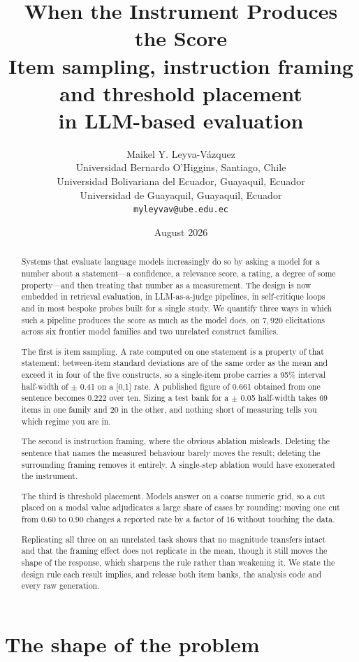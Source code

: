 \documentclass[11pt,letterpaper]{article}
\title{When the Instrument Produces the Score\\
\large Item sampling, instruction framing and threshold placement\\
in {LLM}-based evaluation}
\author{
  Maikel Y. Leyva-V\'azquez\\
  {\small Universidad Bernardo O'Higgins, Santiago, Chile}\\
  {\small Universidad Bolivariana del Ecuador, Guayaquil, Ecuador}\\
  {\small Universidad de Guayaquil, Guayaquil, Ecuador}\\
  {\small \texttt{myleyvav@ube.edu.ec}}
}
\date{August 2026}
\begin{document}
\maketitle

\begin{abstract}
Systems that evaluate language models increasingly do so by asking a model for a number about a statement---a confidence, a relevance score, a rating, a degree of some property---and then treating that number as a measurement. The design is now embedded in retrieval evaluation, in LLM-as-a-judge pipelines, in self-critique loops and in most bespoke probes built for a single study. We quantify three ways in which such a pipeline produces the score as much as the model does, on $7{,}920$ elicitations across six frontier model families and two unrelated construct families.

The first is item sampling. A rate computed on one statement is a property of that statement: between-item standard deviations are of the same order as the mean and exceed it in four of the five constructs, so a single-item probe carries a 95\% interval half-width of $\pm$ 0.41 on a [0,1] rate. A published figure of 0.661 obtained from one sentence becomes 0.222 over ten. Sizing a test bank for a $\pm$ 0.05 half-width takes 69 items in one family and 20 in the other, and nothing short of measuring tells you which regime you are in.

The second is instruction framing, where the obvious ablation misleads. Deleting the sentence that names the measured behaviour barely moves the result; deleting the surrounding framing removes it entirely. A single-step ablation would have exonerated the instrument.

The third is threshold placement. Models answer on a coarse numeric grid, so a cut placed on a modal value adjudicates a large share of cases by rounding: moving one cut from 0.60 to 0.90 changes a reported rate by a factor of 16 without touching the data.

Replicating all three on an unrelated task shows that no magnitude transfers intact and that the framing effect does not replicate in the mean, though it still moves the shape of the response, which sharpens the rule rather than weakening it. We state the design rule each result implies, and release both item banks, the analysis code and every raw generation.
\end{abstract}

\section{The shape of the problem}
\end{document}
